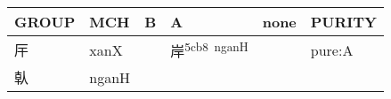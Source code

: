 \documentclass[14pt,a4paper]{scrartcl}
\begin{document}
\begin{longtable}[c]{@{}llllll@{}}
\toprule
\begin{minipage}[b]{0.14\columnwidth}\raggedright\strut
GROUP
\strut\end{minipage} &
\begin{minipage}[b]{0.14\columnwidth}\raggedright\strut
MCH
\strut\end{minipage} &
\begin{minipage}[b]{0.14\columnwidth}\raggedright\strut
B
\strut\end{minipage} &
\begin{minipage}[b]{0.14\columnwidth}\raggedright\strut
A
\strut\end{minipage} &
\begin{minipage}[b]{0.14\columnwidth}\raggedright\strut
none
\strut\end{minipage} &
\begin{minipage}[b]{0.14\columnwidth}\raggedright\strut
PURITY
\strut\end{minipage}\tabularnewline
\midrule
\endhead
\begin{minipage}[t]{0.14\columnwidth}\raggedright\strut
厈
\strut\end{minipage} &
\begin{minipage}[t]{0.14\columnwidth}\raggedright\strut
xanX
\strut\end{minipage} &
\begin{minipage}[t]{0.14\columnwidth}\raggedright\strut
\strut\end{minipage} &
\begin{minipage}[t]{0.14\columnwidth}\raggedright\strut
岸\textsuperscript{5cb8~nganH}
\strut\end{minipage} &
\begin{minipage}[t]{0.14\columnwidth}\raggedright\strut
\strut\end{minipage} &
\begin{minipage}[t]{0.14\columnwidth}\raggedright\strut
pure:A
\strut\end{minipage}\tabularnewline
\begin{minipage}[t]{0.14\columnwidth}\raggedright\strut
倝
\strut\end{minipage} &
\begin{minipage}[t]{0.14\columnwidth}\raggedright\strut
nganH
\strut\end{minipage} &
\begin{minipage}[t]{0.14\columnwidth}\raggedright\strut
\strut\end{minipage} &
\begin{minipage}[t]{0.14\columnwidth}\raggedright\strut

\end{minipage}
\end{longtable}
\end{document}

